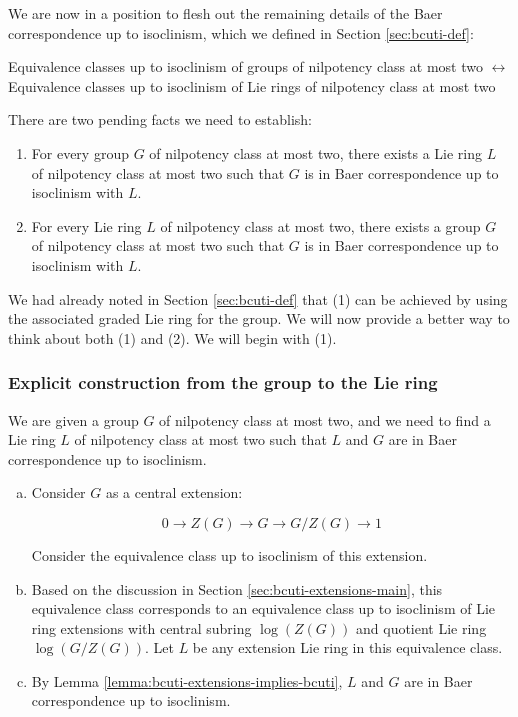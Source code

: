 We are now in a position to flesh out the remaining details of the
Baer correspondence up to isoclinism, which we defined in Section
\ref{sec:bcuti-def}:

\begin{center}
  Equivalence classes up to isoclinism of groups of nilpotency class at
  most two $\leftrightarrow$ Equivalence classes up to isoclinism of Lie
  rings of nilpotency class at most two
\end{center}
There are two pending facts we need to establish:

\begin{enumerate}
\item For every group $G$ of nilpotency class at most two, there
  exists a Lie ring $L$ of nilpotency class at most two such that $G$
  is in Baer correspondence up to isoclinism with $L$.
\item For every Lie ring $L$ of nilpotency class at most two, there
  exists a group $G$ of nilpotency class at most two such that $G$ is
  in Baer correspondence up to isoclinism with $L$.
\end{enumerate}

We had already noted in Section \ref{sec:bcuti-def} that (1) can be
achieved by using the associated graded Lie ring for the group. We
will now provide a better way to think about both (1) and (2). We will
begin with (1).

\subsubsection{Explicit construction from the group to the Lie ring}

We are given a group $G$ of nilpotency class at most two, and we need
to find a Lie ring $L$ of nilpotency class at most two such that $L$
and $G$ are in Baer correspondence up to isoclinism.

\begin{enumerate}[(a)]
\item Consider $G$ as a central extension:

  $$0 \to Z(G) \to G \to G/Z(G) \to 1$$

  Consider the equivalence class up to isoclinism of this extension.

\item Based on the discussion in Section
  \ref{sec:bcuti-extensions-main}, this equivalence class corresponds
  to an equivalence class up to isoclinism of Lie ring extensions with
  central subring $\log(Z(G))$ and quotient Lie ring $\log(G/Z(G))$. Let
  $L$ be any extension Lie ring in this equivalence class.

\item By Lemma \ref{lemma:bcuti-extensions-implies-bcuti}, $L$ and $G$
  are in Baer correspondence up to isoclinism.
\end{enumerate}


